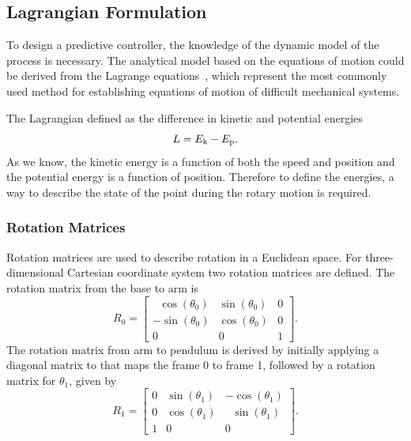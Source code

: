 \subsection{Lagrangian Formulation}
To design a predictive controller, the knowledge of the dynamic model of the process is necessary. The analytical model based on the equations of motion could be derived from the Lagrange equations~\cite{furuta:model}, which represent the most commonly used method for establishing equations of motion of difficult mechanical systems.

The Lagrangian defined as the difference in kinetic and potential energies
\begin{equation}
L = E _{\text{k}} - E _{\text{p}}.
\end{equation}
As we know, the kinetic energy is a function of both the speed and position and the potential energy is a function of position. Therefore to define the energies, a way to describe the state of the point during the rotary motion is required.
\subsubsection{Rotation Matrices}
Rotation matrices are used to describe rotation in a Euclidean space. For three-dimensional Cartesian coordinate system two rotation matrices are defined.
The rotation matrix from the base to arm is
\begin{equation}
	R_0 = 	\begin{bmatrix}
					\ \ \,\cos(\theta_0) & \sin(\theta_0) & 0\\
					-\sin(\theta_0) & \cos(\theta_0) & 0\\
					0 & 0 & 1
				\end{bmatrix}.
\end{equation}
The rotation matrix from arm to pendulum is derived by
initially applying a diagonal matrix to that maps the frame
0 to frame 1, followed by a rotation matrix for $\theta_1$, given by
\begin{equation}
R_1 = 	\begin{bmatrix}
			0 & \sin(\theta_1) & -\cos(\theta_1)\\
			0 & \cos(\theta_1) & \ \ \,\sin(\theta_1)\\
			1 & 0 & 0                      
		\end{bmatrix}.
\end{equation}
